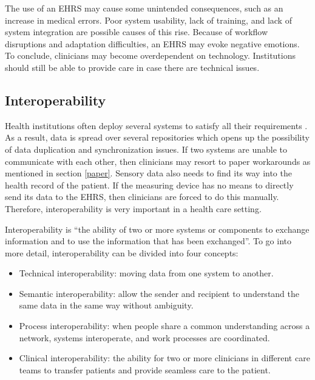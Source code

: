         The use of an EHRS may cause some unintended consequences\cite{Campbell2006}, such as an increase in medical errors. Poor system usability, lack of training, and lack of system integration are possible causes of this rise\cite{Koppel2005}. Because of workflow disruptions and adaptation difficulties, an EHRS may evoke negative emotions. To conclude, clinicians may become overdependent on technology. Institutions should still be able to provide care in case there are technical issues.

    \subsection{Interoperability}\label{interoperability}

    Health institutions often deploy several systems to satisfy all their requirements \cite{Payne2012}. As a result, data is spread over several repositories which opens up the possibility of data duplication and synchronization issues. If two systems are unable to communicate with each other, then clinicians may resort to paper workarounds as mentioned in section \ref{paper}. Sensory data also needs to find its way into the health record of the patient. If the measuring device has no means to directly send its data to the EHRS, then clinicians are forced to do this manually. Therefore, interoperability is very important in a health care setting. %

    Interoperability is ``the ability of two or more systems or components to exchange information and to use the information that has been exchanged''\cite{IEEE1990}. To go into more detail, interoperability can be divided into four concepts\cite{Benson2016}:
    \begin{itemize}
        \item Technical interoperability: moving data from one system to another.
        \item Semantic interoperability: allow the sender and recipient to understand the same data in the same way without ambiguity.
        \item Process interoperability: when people share a common understanding across a network, systems interoperate, and work processes are coordinated.
        \item Clinical interoperability: the ability for two or more clinicians in different care teams to transfer patients and provide seamless care to the patient.
    \end{itemize}

